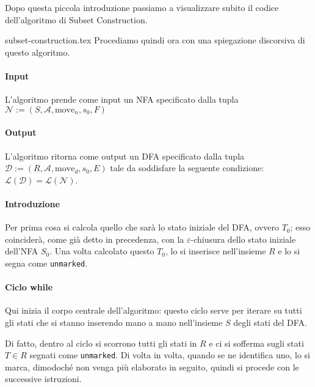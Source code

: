 \documentclass[class=book, crop=false, oneside, 12pt]{standalone}
\begin{document}
Dopo questa piccola introduzione passiamo a visualizzare subito il codice dell'algoritmo di Subset Construction.

{subset-construction.tex} 
\noindent Procediamo quindi ora con una spiegazione discorsiva di questo algoritmo.
\paragraph*{Input}
L'algoritmo prende come input un NFA specificato dalla tupla \(\mathcal{N} := (S, \mathcal{A}, \textrm{move}_n, s_0, F)\)

\paragraph*{Output}
L'algoritmo ritorna come output un DFA specificato dalla tupla \(\mathcal{D} := (R, \mathcal{A}, \textrm{move}_d, s_0, E)\) tale da soddisfare la seguente condizione: \(\mathcal{L}(\mathcal{D}) = \mathcal{L}(\mathcal{N})\).

\paragraph*{Introduzione}
Per prima cosa si calcola quello che sarà lo stato iniziale del DFA, ovvero \(T_0\); esso coinciderà, come già detto in precedenza, con la \(\varepsilon\)-chiusura dello stato iniziale dell'NFA \(S_0\). Una volta calcolato questo \(T_0\),  lo si inserisce nell'insieme \(R\) e lo si segna come \texttt{unmarked}.

\paragraph*{Ciclo while}
Qui inizia il corpo centrale dell'algoritmo: questo ciclo serve per iterare su tutti gli stati che si stanno inserendo mano a mano nell'insieme \(S\) degli stati del DFA. 

Di fatto, dentro al ciclo si scorrono tutti gli stati in \(R\) e ci si sofferma sugli stati \(T \in R\) segnati come \texttt{unmarked}. Di volta in volta, quando se ne identifica uno, lo si marca, dimodoché non venga più elaborato in seguito, quindi si procede con le successive istruzioni.
\end{document}
